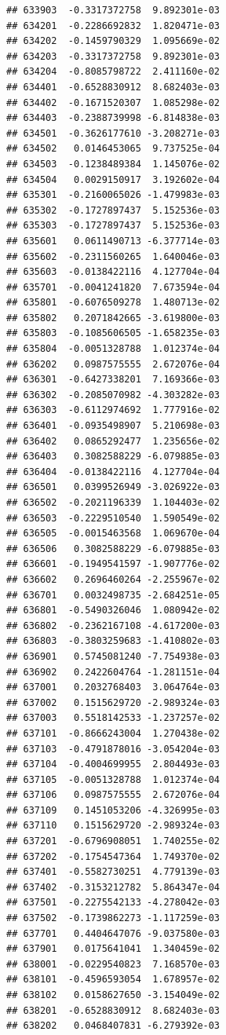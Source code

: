 \begin{frame}[fragile]
\begin{verbatim}
## 633903  -0.3317372758  9.892301e-03
## 634201  -0.2286692832  1.820471e-03
## 634202  -0.1459790329  1.095669e-02
## 634203  -0.3317372758  9.892301e-03
## 634204  -0.8085798722  2.411160e-02
## 634401  -0.6528830912  8.682403e-03
## 634402  -0.1671520307  1.085298e-02
## 634403  -0.2388739998 -6.814838e-03
## 634501  -0.3626177610 -3.208271e-03
## 634502   0.0146453065  9.737525e-04
## 634503  -0.1238489384  1.145076e-02
## 634504   0.0029150917  3.192602e-04
## 635301  -0.2160065026 -1.479983e-03
## 635302  -0.1727897437  5.152536e-03
## 635303  -0.1727897437  5.152536e-03
## 635601   0.0611490713 -6.377714e-03
## 635602  -0.2311560265  1.640046e-03
## 635603  -0.0138422116  4.127704e-04
## 635701  -0.0041241820  7.673594e-04
## 635801  -0.6076509278  1.480713e-02
## 635802   0.2071842665 -3.619800e-03
## 635803  -0.1085606505 -1.658235e-03
## 635804  -0.0051328788  1.012374e-04
## 636202   0.0987575555  2.672076e-04
## 636301  -0.6427338201  7.169366e-03
## 636302  -0.2085070982 -4.303282e-03
## 636303  -0.6112974692  1.777916e-02
## 636401  -0.0935498907  5.210698e-03
## 636402   0.0865292477  1.235656e-02
## 636403   0.3082588229 -6.079885e-03
## 636404  -0.0138422116  4.127704e-04
## 636501   0.0399526949 -3.026922e-03
## 636502  -0.2021196339  1.104403e-02
## 636503  -0.2229510540  1.590549e-02
## 636505  -0.0015463568  1.069670e-04
## 636506   0.3082588229 -6.079885e-03
## 636601  -0.1949541597 -1.907776e-02
## 636602   0.2696460264 -2.255967e-02
## 636701   0.0032498735 -2.684251e-05
## 636801  -0.5490326046  1.080942e-02
## 636802  -0.2362167108 -4.617200e-03
## 636803  -0.3803259683 -1.410802e-03
## 636901   0.5745081240 -7.754938e-03
## 636902   0.2422604764 -1.281151e-04
## 637001   0.2032768403  3.064764e-03
## 637002   0.1515629720 -2.989324e-03
## 637003   0.5518142533 -1.237257e-02
## 637101  -0.8666243004  1.270438e-02
## 637103  -0.4791878016 -3.054204e-03
## 637104  -0.4004699955  2.804493e-03
## 637105  -0.0051328788  1.012374e-04
## 637106   0.0987575555  2.672076e-04
## 637109   0.1451053206 -4.326995e-03
## 637110   0.1515629720 -2.989324e-03
## 637201  -0.6796908051  1.740255e-02
## 637202  -0.1754547364  1.749370e-02
## 637401  -0.5582730251  4.779139e-03
## 637402  -0.3153212782  5.864347e-04
## 637501  -0.2275542133 -4.278042e-03
## 637502  -0.1739862273 -1.117259e-03
## 637701   0.4404647076 -9.037580e-03
## 637901   0.0175641041  1.340459e-02
## 638001  -0.0229540823  7.168570e-03
## 638101  -0.4596593054  1.678957e-02
## 638102   0.0158627650 -3.154049e-02
## 638201  -0.6528830912  8.682403e-03
## 638202   0.0468407831 -6.279392e-03

\end{verbatim}
\end{frame}

